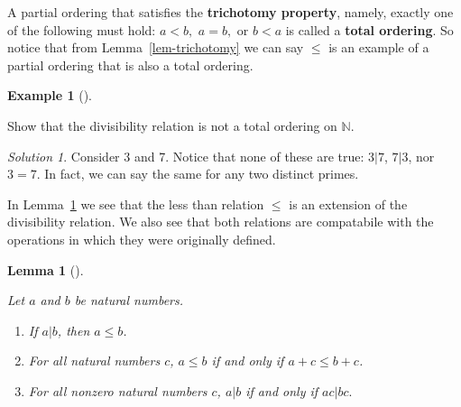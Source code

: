 \documentclass[
  twoside,
  12pt,
  letterpaper]{article}
\providecommand{\tightlist}{%
  \setlength{\itemsep}{0pt}\setlength{\parskip}{0pt}}\usepackage{longtable,booktabs,array}
\theoremstyle{definition}
\theoremstyle{plain}
\newtheorem{lemma}{Lemma}[section]
\theoremstyle{plain}
\theoremstyle{definition}
\newtheorem{example}{Example}[section]
\theoremstyle{definition}
\theoremstyle{remark}
\newtheorem*{solution}{Solution}
\begin{document}
A partial ordering that satisfies the \textbf{trichotomy property},
namely, exactly one of the following must hold: \(a < b,\) \(a = b,\) or
\(b < a\) is called a \textbf{total ordering}. So notice that from
Lemma~\ref{lem-trichotomy} we can say \(\leq\) is an example of a
partial ordering that is also a total ordering.

\begin{example}[]\protect\hypertarget{exm-div-trich}{}\label{exm-div-trich}

Show that the divisibility relation is not a total ordering on
\(\mathbb{N}\).

\end{example}

\begin{solution}

Consider 3 and 7. Notice that none of these are true: \(3|7\), \(7|3\),
nor \(3=7\). In fact, we can say the same for any two distinct primes.

\end{solution}

In Lemma~\ref{lem-ordering-props} we see that the less than relation
\(\leq\) is an extension of the divisibility relation. We also see that
both relations are compatabile with the operations in which they were
originally defined.

\begin{lemma}[]\protect\hypertarget{lem-ordering-props}{}\label{lem-ordering-props}

Let \(a\) and \(b\) be natural numbers.

\begin{enumerate}
\def\labelenumi{\arabic{enumi}.}
\tightlist
\item
  If \(a|b\), then \(a\leq b\).
\item
  For all natural numbers \(c\), \(a\leq b\) if and only if
  \(a+c\leq b+c\).
\item
  For all nonzero natural numbers \(c\), \(a|b\) if and only if
  \(ac|bc.\)
\end{enumerate}

\end{lemma}
\end{document}

